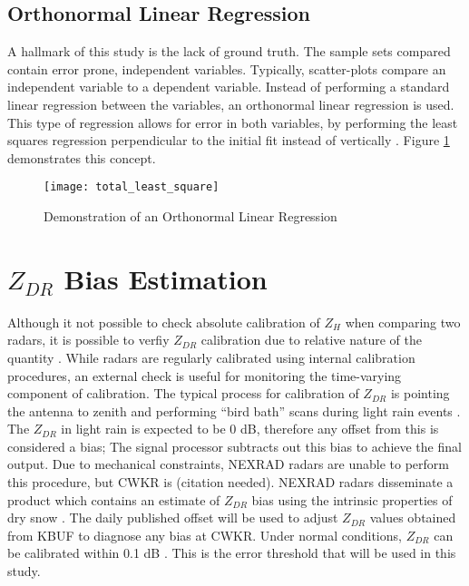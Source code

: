 \subsection{Orthonormal Linear Regression}
A hallmark of this study is the lack of ground truth. The sample sets compared contain error prone, independent variables. Typically, scatter-plots compare
an independent variable to a dependent variable. Instead of performing a standard linear regression between the variables, an orthonormal linear regression
is used. This type of regression allows for error in both variables, by performing the least squares regression perpendicular to the initial fit instead of
vertically \citep{Markovsky2007}. Figure \ref{fig:total_least_squares} demonstrates this concept.
\begin{figure}
\texttt{[image: total\_least\_square]}\centering
\caption{Demonstration of an Orthonormal Linear Regression} 
\label{fig:total_least_squares}
\end{figure}
\section{$Z_{DR}$ Bias Estimation}
Although it not possible to check absolute calibration of $Z_{H}$ when comparing two radars, it is possible to verfiy $Z_{DR}$ calibration due to relative
nature of the quantity \citep{Zrnic2006}. While radars are regularly calibrated using internal calibration procedures, an external check is useful for
monitoring the time-varying component of calibration. The typical process for calibration of $Z_{DR}$ is pointing the antenna to zenith and performing ``bird
bath'' scans during light rain events \citep{Hubbert2006}. The $Z_{DR}$ in light rain is expected to be 0 dB, therefore any offset from this is considered a
bias; The signal processor subtracts out this bias to achieve the final output. Due to mechanical constraints, NEXRAD radars are unable to perform this
procedure, but CWKR is (citation needed). NEXRAD radars disseminate a product which contains an estimate of $Z_{DR}$ bias using the intrinsic properties of
dry snow \cite{Zittel2015}. The daily published offset will be used to adjust $Z_{DR}$ values obtained from KBUF to diagnose any bias at CWKR. Under normal conditions, $Z_{DR}$ can be calibrated within 0.1 dB \citep{Zrnic2006}. This is the error threshold that will be used in this study.